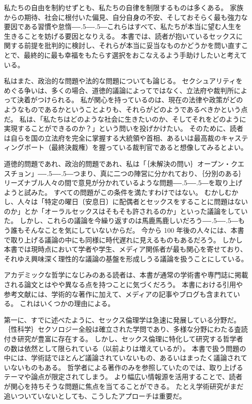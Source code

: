 \documentclass[paper=a4,book,openany]{jlreq}
\def\DDASH{―\kern-.5\zw―\kern-.5\zw―} %
\begin{document}
私たちの自由を制約せずとも、私たちの自律を制限するものは多くある。
家族からの期待、社会に根付いた偏見、自分自身の不安、そしておそらく最も強力な要因である習慣や怠惰{\DDASH}これらはすべて、私たちが本当に望む人生を生きることを妨げる要因となりえる。
本書では、読者が抱いているセックスに関する前提を批判的に検討し、それらが本当に妥当なものかどうかを問い直すことで、最終的に最も幸福をもたらす選択をおこなえるよう手助けしたいと考えている。

私はまた、政治的な問題や法的な問題についても論じる。
セクシュアリティをめぐる争いは、多くの場合、道徳的議論によってではなく、立法府や裁判所によって決着がつけられる。
私が関心を持っているのは、現在の法律や政策がどのようなものであるかということよりも、それらがどのようであるべきかという点だ。
私は、「私たちはどのような社会に生きたいのか、そしてそれをどのように実現することができるのか？」という問いを投げかけたい。
そのために、読者は自らを国の立法府を完全に掌握する大統領や首相、あるいは最高裁のキャスティングボート（最終決裁権）を握っている裁判官であると想像してみるとよい。

道徳的問題であれ、政治的問題であれ、私は「｛未解決の問い｝{オープン・クエスチョン}」{\DDASH}つまり、真に二つの陣営に分かれており、｛分別のある｝{リーズナブル}人々の間で意見が分かれているような問題{\DDASH}を取り上げようと試みた。
すべての問題がこの条件を満たすわけではない。
むかしむかし、人々は「特定の曜日〔安息日〕に配偶者とセックスをすることに問題はないのか」とか「オーラルセックスはそもそも許されるのか」といった議論をしていた。
しかし、これらの議論を今繰り返すのは馬鹿馬鹿しいだろう{\DDASH}もう誰もそんなことを気にしていないからだ。
今から 100 年後の人々には、本書で取り上げる議論の中にも同様に時代遅れに見えるものもあるだろう。
しかし本書では現時点において学者や学生、メディア関係者が最も関心を寄せており、それゆえ興味深く理性的な議論の基盤を形成しうる議論を扱うことにしている。

アカデミックな哲学になじみのある読者は、本書が通常の学術書や専門誌に掲載される論文とはやや異なる点を持つことに気づくだろう。
本書における引用や参考文献には、学術的な著作に加えて、メディアの記事やブログも含まれている。
これはいくつかの理由による。

第一に、すでに述べたように、セックス倫理学は急速に発展している分野だ。
｛性科学｝{セクソロジー}全般は確立された学問であり、多様な分野にわたる査読付き研究が豊富に存在する。
しかし、セックス倫理に特化して研究する哲学者の数は依然として限られている（以前よりは増えているが）。
本書で扱う問題の中には、学術誌でほとんど議論されていないもの、あるいはまったく議論されていないものもある。
哲学者による著作のみを参照していたのでは、取り上げるテーマや論点が限定されてしまう。
より幅広い情報源を活用することで、読者が関心を持ちそうな問題に焦点を当てることができる。
たとえ学術研究がまだ追いついていないとしても、こうしたアプローチは重要だ。
\end{document}
